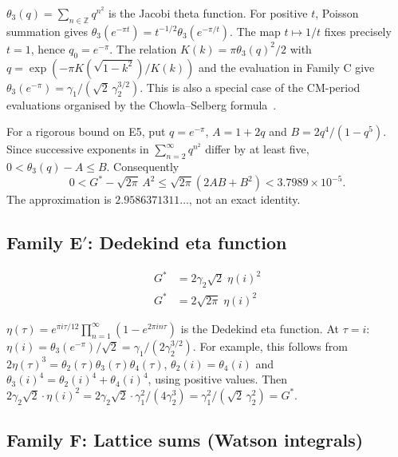 \documentclass[12pt,reqno]{amsart}
\theoremstyle{definition}
\theoremstyle{remark}
\newcommand{\ZZ}{\mathbb{Z}}
\newcommand{\Gstar}{G^{\!*}}
\begin{document}
\noindent
$\theta_{3}(q)=\sum_{n\in\ZZ}q^{n^{2}}$ is the Jacobi theta function.
For positive $t$, Poisson summation gives
$\theta_{3}(e^{-\pi t})=t^{-1/2}\theta_{3}(e^{-\pi/t})$.
The map $t\mapsto1/t$ fixes precisely $t=1$, hence $q_0=e^{-\pi}$.
The relation $K(k)=\pi\theta_3(q)^2/2$ with
$q=\exp(-\pi K(\sqrt{1-k^2})/K(k))$ \cite[20.9.2]{DLMF}
and the evaluation in Family C give
$\theta_{3}(e^{-\pi})=\gamma_{1}/(\sqrt2\,\gamma_{2}^{3/2})$.
This is also a special case of the CM-period evaluations organised by
the Chowla--Selberg formula~\cite{ChowlaSelberg}.

For a rigorous bound on E5, put $q=e^{-\pi}$, $A=1+2q$ and
$B=2q^4/(1-q^5)$. Since successive exponents in
$\sum_{n=2}^\infty q^{n^2}$ differ by at least five,
$0<\theta_3(q)-A\leq B$. Consequently
\[
 0<\Gstar-\sqrt{2\pi}\,A^2
 \leq\sqrt{2\pi}(2AB+B^2)<3.7989\times10^{-5}.
\]
The approximation is $2.9586371311\ldots$, not an exact identity.

\subsection{Family \texorpdfstring{E$'$}{E'}: Dedekind eta function}\label{sec:Eprime}

\begin{align}
  {\Gstar} &= 2\gamma_{2}\sqrt{2}\;\eta(i)^{2}
    \tag{E6}\label{E6}\\[5pt]
  {\Gstar} &= 2\sqrt{2\pi}\;\eta(i)^{2}
    \tag{E7}\label{E7}
\end{align}

\noindent
$\eta(\tau)=e^{\pi i\tau/12}\prod_{n=1}^{\infty}(1-e^{2\pi in\tau})$
is the Dedekind eta function.
At $\tau=i$: $\eta(i)=\theta_3(e^{-\pi})/\sqrt2
=\gamma_{1}/(2\gamma_{2}^{3/2})$.
For example, this follows from
$2\eta(\tau)^3=\theta_2(\tau)\theta_3(\tau)\theta_4(\tau)$,
$\theta_2(i)=\theta_4(i)$ and
$\theta_3(i)^4=\theta_2(i)^4+\theta_4(i)^4$, using positive values.
Then $2\gamma_{2}\sqrt{2}\cdot\eta(i)^{2}
=2\gamma_{2}\sqrt{2}\cdot\gamma_{1}^{2}/(4\gamma_{2}^{3})
=\gamma_{1}^{2}/(\sqrt{2}\,\gamma_{2}^{2})={\Gstar}$.

\subsection{Family F: Lattice sums (Watson integrals)}\label{sec:F}
\end{document}
